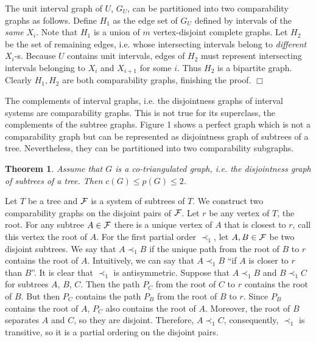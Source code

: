\documentclass[12pt]{article}
\newtheorem{theorem}{Theorem}%
\def\qed{\ifhmode\unskip\nobreak\fi\quad\ifmmode\Box\else$\Box$\fi}
\def\qed{\hfill $\Box$}
\begin{document}
The unit interval graph of $U$, $G_U$, can be partitioned into two comparability graphs as follows.
Define $H_1$ as the edge set of $G_U$ defined by intervals of the {\em same}
$X_i$. Note that $H_1$ is a union of $m$ vertex-disjoint complete graphs.
Let $H_2$ be the set of remaining edges, i.e. whose intersecting intervals belong to {\em different}
$X_i$-s.
Because $U$ contains unit intervals,
edges of $H_2$ must represent intersecting intervals belonging to $X_i$ and $X_{i+1}$ for some $i$.
Thus $H_2$ is a bipartite graph. Clearly $H_1,H_2$ are both comparability graphs, finishing the proof.   \qed


\medskip





The complements of interval graphs, i.e. the disjointness graphs of interval systems are comparability graphs.
This is not true for its superclass, the complements  of the subtree graphs.
Figure 1 shows a perfect graph which is not a comparability graph but can be represented
as disjointness graph of subtrees of a tree.  Nevertheless, they can be partitioned into two comparability subgraphs.
\begin{theorem} \label{co-triangulated}
  Assume that $G$ is a co-triangulated graph,
  i.e. the disjoint\-ness graph of subtrees of a tree. Then $c(G)\le p(G)\le 2$.
\end{theorem}

\medskip
{} Let $T$ be a tree and $\cal{F}$ is a system of subtrees of $T$.
We construct two comparability graphs on the disjoint pairs of $\cal{F}$.
 Let $r$ be any vertex of $T$, the root. For any subtree $A\in {\cal{F}}$
there is a unique vertex of $A$ that is closest to $r$, call this vertex the root
of $A$.
For the first partial order $\prec_1$,
let $A,B\in {\cal{F}}$
be two disjoint subtrees. We say that
$A\prec_1 B$ if the unique path from the root of $B$ to $r$ contains the root of $A$. Intuitively,
we can say that $A\prec_1 B$ ``if $A$ is closer to $r$ than $B$''.
It is clear that $\prec_1$ is antisymmetric. Suppose that  $A\prec_1 B$ and  $B\prec_1 C$ for subtrees $A$, $B$, $C$.
Then the path $P_C$ from the root of $C$ to $r$ contains the root of $B$. But then $P_C$ contains the path $P_B$
from the root of $B$ to $r$. Since $P_B$ contains the root of $A$, $P_C$ also contains
the root of $A$. Moreover, the root of $B$ separates $A$ and $C$, so they are disjoint.
Therefore, $A\prec_1 C$, consequently, $\prec_1$ is transitive, so it is
a partial ordering on the disjoint pairs.
\end{document}
